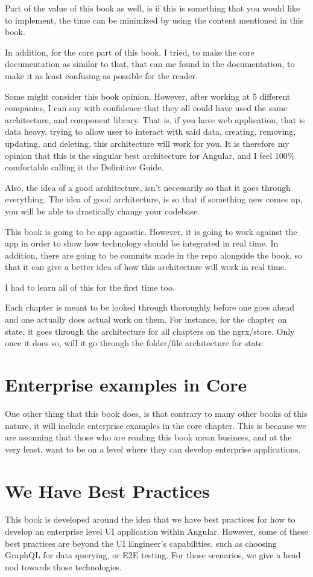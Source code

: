 Part of the value of this book as well, is if this is something that you would
like to implement, the time can be minimized by using the content mentioned
in this book.

In addition, for the core part of this book. I tried, to make the core
documentation as similar to that, that can me found in the documentation, to make
it as least confusing as possible for the reader.

Some might consider this book opinion. However, after working at 5 different
companies, I can say with confidence that they all could have used the same
architecture, and component library. That is, if you have web application, that
is data heavy, trying to allow user to interact with said data, creating,
removing, updating, and deleting, this architecture will work for you. It is
therefore my opinion that this is the singular best architecture for Angular,
and I feel 100\% comfortable calling it the Definitive Guide.

Also, the idea of a good architecture, isn't necessarily so that it goes through
everything. The idea of good architecture, is so that if something new comes up,
you will be able to drastically change your codebase. %

This book is going to be app agnostic. However, it is going to work against the
app in order to show how technology should be integrated in real time. In
addition, there are going to be commits made in the repo alongside the book,
so that it can give a better idea of how this architecture will work in real
time.

I had to learn all of this for the first time too. 

Each chapter is meant to be looked through thoroughly before one goes ahead and
one actually does actual work on them. For instance, for the chapter on state,
it goes through the architecture for all chapters on the ngrx/store. Only once
it does so, will it go through the folder/file architecture for state.

\section{Enterprise examples in Core}
One other thing that this book does, is that contrary to many other books of
this nature, it will include enterprise examples in the core chapter. This is
because we are assuming that those who are reading this book mean business, and 
at the very least, want to be on a level where they can develop enterprise
applications.

\section{ We Have Best Practices }
This book is developed around the idea that we have best practices for how to
develop an enterprise level UI application within Angular. However, some of 
these best practices are beyond the UI Engineer's capabilities, such as 
choosing GraphQL for data querying, or E2E testing. For those scenarios, we 
give a head nod towards those technologies. 
